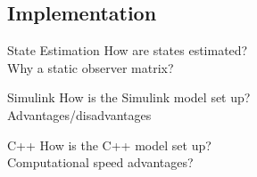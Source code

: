 
\subsection{Implementation}
\begin{frame}{State Estimation}
  How are states estimated?\\
  Why a static observer matrix?
\end{frame}

\begin{frame}{Simulink}
  How is the Simulink model set up?\\
  Advantages/disadvantages
\end{frame}

\begin{frame}{C++}
  How is the C++ model set up?\\
  Computational speed advantages?
\end{frame}

